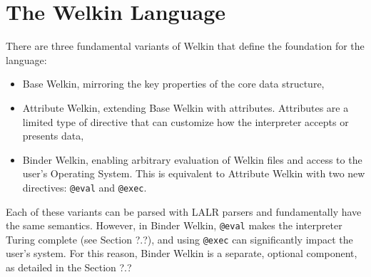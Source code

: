 \section{The Welkin Language}

There are three fundamental variants of Welkin that define the foundation for the language:
\begin{itemize}
	\item Base Welkin, mirroring the key properties of the core data structure,
	\item Attribute Welkin, extending Base Welkin with attributes. Attributes are a limited type of directive that can customize how the interpreter accepts or presents data,
	\item Binder Welkin, enabling arbitrary evaluation of Welkin files and access to the user's Operating System. This is equivalent to Attribute Welkin with two new directives: \texttt{@eval} and \texttt{@exec}. \end{itemize}
Each of these variants can be parsed with LALR parsers and fundamentally have the same semantics. However, in Binder Welkin, \texttt{@eval} makes the interpreter Turing complete (see Section ?.?), and using \texttt{@exec} can significantly impact the user's system. For this reason, Binder Welkin is a separate, optional component, as detailed in the Section ?.?
